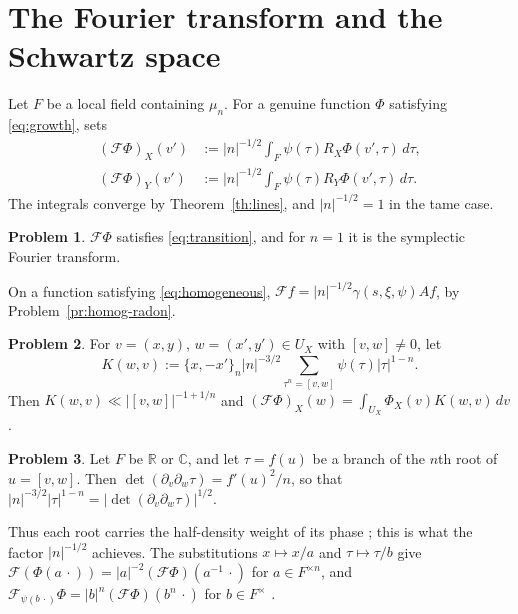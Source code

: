 \documentclass[reqno]{amsart}
\newcommand{\Fc}{\mathcal{F}}
\numberwithin{equation}{section}
\theoremstyle{definition}
\newtheorem{problem}{Problem}[section]
\theoremstyle{plain}
\begin{document}
\section{The Fourier transform and the Schwartz space}\label{sec:transform}

Let $F$ be a local field containing $\mu_n$.  For a genuine function $\Phi$ satisfying \eqref{eq:growth}, \cite[Definition~4.4]{N} sets
\begin{equation*}
  \begin{aligned}
    (\Fc \Phi)_X(v') &:= \lvert n \rvert^{-1/2} \int_F \psi(\tau) R_X \Phi(v', \tau) \, d \tau, \\
    (\Fc \Phi)_Y(v') &:= \lvert n \rvert^{-1/2} \int_F \psi(\tau) R_Y \Phi(v', \tau) \, d \tau.
  \end{aligned}
\end{equation*}
The integrals converge by Theorem~\ref{th:lines}, and $\lvert n \rvert^{-1/2} = 1$ in the tame case.

\begin{problem}\label{pr:ft-genuine}
  $\Fc \Phi$ satisfies \eqref{eq:transition}, and for $n = 1$ it is the symplectic Fourier transform.
\end{problem}

On a function satisfying \eqref{eq:homogeneous}, $\Fc f = \lvert n \rvert^{-1/2} \gamma(s, \xi, \psi) A f$, by Problem~\ref{pr:homog-radon}.

\begin{problem}\label{pr:ft-kernel}
  For $v = (x, y)$, $w = (x', y') \in U_X$ with $[v, w] \neq 0$, let
  \begin{equation*}
    K(w, v) := \{x, -x'\}_n \lvert n \rvert^{-3/2} \sum_{\tau^n = [v, w]} \psi(\tau) \lvert \tau \rvert^{1-n}.
  \end{equation*}
  Then $K(w, v) \ll \lvert [v, w] \rvert^{-1 + 1/n}$ and $(\Fc \Phi)_X(w) = \int_{U_X} \Phi_X(v) K(w, v) \, d v$.
\end{problem}

\begin{problem}\label{pr:ft-half-density}
  Let $F$ be $\mathbb{R}$ or $\mathbb{C}$, and let $\tau = f(u)$ be a branch of the $n$th root of $u = [v, w]$.  Then $\det(\partial_v \partial_w \tau) = f'(u)^2 / n$, so that $\lvert n \rvert^{-3/2} \lvert \tau \rvert^{1-n} = \lvert \det(\partial_v \partial_w \tau) \rvert^{1/2}$.
\end{problem}

Thus each root carries the half-density weight of its phase \cite[Remark~4.7]{N}; this is what the factor $\lvert n \rvert^{-1/2}$ achieves.  The substitutions $x \mapsto x / a$ and $\tau \mapsto \tau / b$ give $\Fc(\Phi(a \, \cdot)) = \lvert a \rvert^{-2} (\Fc \Phi)(a^{-1} \, \cdot)$ for $a \in F^{\times n}$, and $\Fc_{\psi(b \, \cdot)} \Phi = \lvert b \rvert^n (\Fc \Phi)(b^n \, \cdot)$ for $b \in F^\times$ \cite[Lemma~4.8]{N}.
\end{document}
